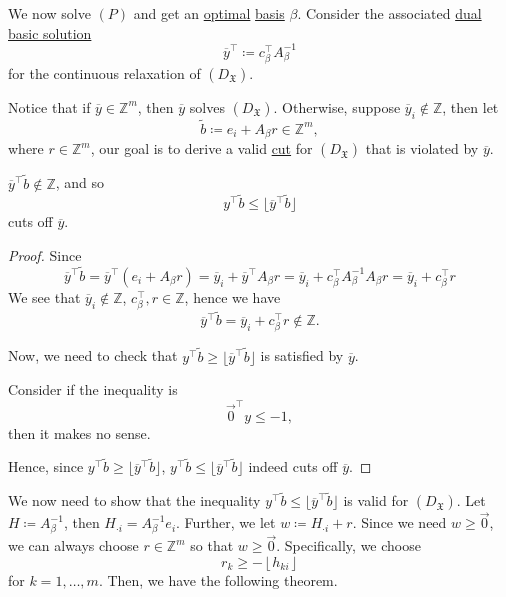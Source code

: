 We now solve \((P)\) and get an \hyperref[def:optimal-solution]{optimal} \hyperref[def:basic]{basis} \(\beta\). Consider the associated
\hyperref[def:dual-basic-solution]{dual basic solution}
\[
	\overline{y}^{\top}\coloneqq c_{\beta}^{\top}A^{-1}_{\beta}
\]
for the continuous relaxation of \((D_{\mathfrak{X}})\).

Notice that if \(\overline{y}\in\mathbb{Z}^m\), then \(\overline{y}\) solves \((D_{\mathfrak{X}})\). Otherwise, suppose
\(\overline{y}_{i}\notin \mathbb{Z}\), then let
\[
	\widetilde{b}\coloneqq e_{i} + A_{\beta}r\in\mathbb{Z}^m,
\]
where \(r\in\mathbb{Z}^m\), our goal is to derive a valid \hyperref[def:Chvatal-Gomory-cut]{cut} for \((D_{\mathfrak{X}})\)
that is violated by \(\overline{y} \).

\begin{theorem}\label{thm:lec24-1}
	\(\overline{y}^{\top}\widetilde{b}\notin \mathbb{Z}\), and so
	\[
		y^{\top}\widetilde{b}\leq \lfloor \overline{y}^{\top}\widetilde{b} \rfloor
	\]
	cuts off \(\overline{y}\).
\end{theorem}
\begin{proof}
	Since
	\[
		\overline{y}^{\top}\widetilde{b} = \overline{y}^{\top}(e_{i}+A_{\beta}r) = \overline{y}_{i} + \overline{y}^{\top}A_{\beta}r = \overline{y}_{i} +c_{\beta}^{\top}A^{-1}_{\beta}A_{\beta}r = \overline{y}_{i} +c^{\top}_{\beta}r
	\]
	We see that \(\overline{y}_{i}\notin\mathbb{Z}\), \(c_{\beta}^{\top}, r\in \mathbb{Z}\), hence we have
	\[
		\overline{y}^{\top}\widetilde{b} = \overline{y}_{i}+c^{\top}_{\beta}r\notin \mathbb{Z}.
	\]

	Now, we need to check that \(y^{\top}\widetilde{b}\geq \lfloor \overline{y}^{\top}\widetilde{b} \rfloor\) is satisfied by \(\overline{y}\).

	\begin{intuition}
		Consider if the inequality is
		\[
			\vec{0}^{\top}y\leq -1,
		\]
		then it makes no sense.
	\end{intuition}
	Hence, since \(y^{\top}\widetilde{b}\geq \lfloor \overline{y}^{\top}\widetilde{b} \rfloor\), \(y^{\top}\widetilde{b}\leq \lfloor \overline{y}^{\top}\widetilde{b} \rfloor\)
	indeed cuts off \(\overline{y} \).
\end{proof}

We now need to show that the inequality \(y^{\top}\widetilde{b}\leq \lfloor \overline{y}^{\top}\widetilde{b} \rfloor\) is valid for \((D_{\mathfrak{X}})\).
Let \(H\coloneqq A^{-1}_{\beta}\), then \(H_{\cdot i} = A^{-1}_{\beta}e_{i}\). Further, we let \(w\coloneqq H_{\cdot i}+r\). Since we need
\(w\geq \vec{0}\), we can always choose \(r\in \mathbb{Z}^m\) so that \(w\geq \vec{0}\). Specifically, we choose
\[
	r_k \geq -\left\lfloor h_{ki} \right\rfloor
\] for \(k = 1, \ldots , m\). Then, we have the following theorem.

